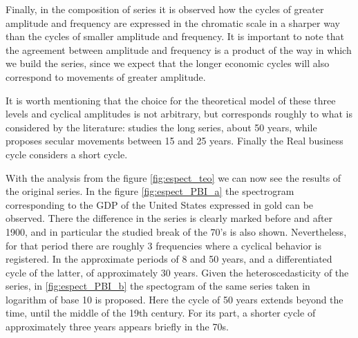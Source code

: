 \documentclass[a4paper]{article}
\begin{document}
Finally, in the composition of series it is observed how the cycles of greater amplitude and frequency are expressed in the chromatic scale in a sharper way than the cycles of smaller amplitude and frequency. It is important to note that the agreement between amplitude and frequency is a product of the way in which we build the series, since we expect that the longer economic cycles will also correspond to movements of greater amplitude.

It is worth mentioning that the choice for the theoretical model of these three levels and cyclical amplitudes is not arbitrary, but corresponds roughly to what is considered by the literature: \cite{kondratieff1979long} studies the long series, about 50 years, while \cite {kuznets1930secular} proposes secular movements between 15 and 25 years. Finally the Real business cycle \citep{kydland1982time} considers a short cycle.

With the analysis from the figure \ref{fig:espect_teo} we can now see the results of the original series. In the figure \ref{fig:espect_PBI_a} the spectrogram corresponding to the GDP of the United States expressed in gold can be observed. There the difference in the series is clearly marked before and after 1900, and in particular the studied break of the 70's is also shown. Nevertheless, for that period there are roughly 3 frequencies where a cyclical behavior is registered. In the approximate periods of 8 and 50 years, and a differentiated cycle of the latter, of approximately 30 years. Given the heteroscedasticity of the series, in \ref{fig:espect_PBI_b} the spectogram of the same series taken in logarithm of base 10 is proposed. Here the cycle of 50 years extends beyond the time, until the middle of the 19th century. For its part, a shorter cycle of approximately three years appears briefly in the 70s.

\end{document}
